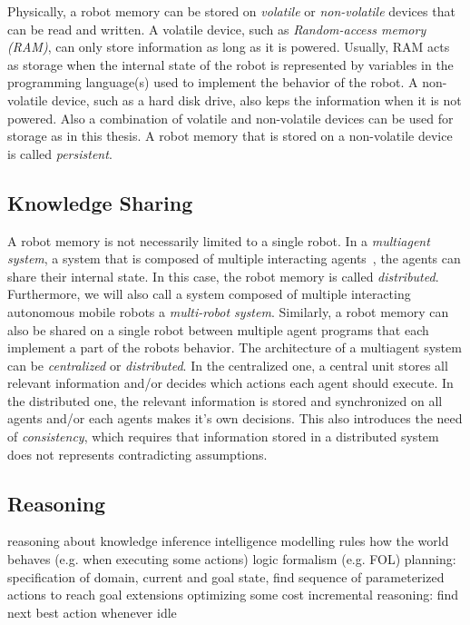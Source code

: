 Physically, a robot memory can be stored on \emph{volatile} or
\emph{non-volatile} devices that can be read and written. A volatile
device, such as \emph{Random-access memory (RAM)}, can only store
information as long as it is powered. Usually, RAM acts as storage
when the internal state of the robot is represented by variables in
the programming language(s) used to implement the behavior of the
robot.  A non-volatile device, such as a hard disk drive, also keps
the information when it is not powered. Also a combination of volatile
and non-volatile devices can be used for storage as in this thesis. A
robot memory that is stored on a non-volatile device is called
\emph{persistent}.

\subsection{Knowledge Sharing}
\label{sec:knowledge-sharing}
A robot memory is not necessarily limited to a single robot. In a
\emph{multiagent system}, a system that is composed of multiple
interacting agents~\cite{multiagentsystems}, the agents can share
their internal state. In this case, the robot memory is called
\emph{distributed}. Furthermore, we will also call a system composed
of multiple interacting autonomous mobile robots a \emph{multi-robot
  system}. Similarly, a robot memory can also be shared on a single
robot between multiple agent programs that each implement a part of
the robots behavior. The architecture of a multiagent system can be
\emph{centralized} or \emph{distributed}. In the centralized one,
a central unit stores all relevant information and/or decides which
actions each agent should execute. In the distributed one, the
relevant information is stored and synchronized on all agents and/or
each agents makes it's own decisions. This also introduces the need of
\emph{consistency}, which requires that information stored in a
distributed system does not represents contradicting assumptions.

\subsection{Reasoning}
\label{sec:reasoning}
reasoning about knowledge 
inference
intelligence
modelling rules how the world behaves (e.g. when executing some actions)
logic formalism (e.g. FOL)
planning: specification of domain, current and goal state, find sequence of parameterized actions to reach goal
  extensions optimizing some cost
incremental reasoning: find next best action whenever idle

